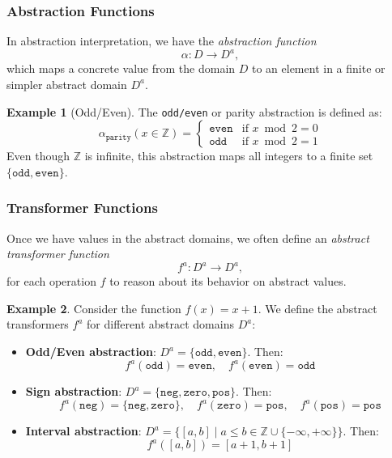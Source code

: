 \documentclass[oneside,11pt,dvipsnames]{book}
\numberwithin{equation}{section}
\theoremstyle{definition}
\newtheorem{example}{Example}[section]
\theoremstyle{remark}
\begin{document}
\subsubsection{Abstraction Functions} In abstraction interpretation, we have the \emph{abstraction function}
\[
\alpha : D \to D^a,
\]
which maps a concrete value from the domain $D$ to an element in a finite or simpler abstract domain $D^a$. 

\begin{example}[Odd/Even]
    The \texttt{odd/even} or parity abstraction is defined as:
\[
\alpha_{\texttt{parity}}(x \in \mathbb{Z}) =
\begin{cases}
\texttt{even} & \text{if } x \bmod 2 = 0 \\
\texttt{odd}  & \text{if } x \bmod 2 = 1
\end{cases}
\]
Even though $\mathbb{Z}$ is infinite, this abstraction maps all integers to a finite set $\{\texttt{odd}, \texttt{even}\}$. 
\end{example}

\subsubsection{Transformer Functions} Once we have values in the abstract domains, we often define an \emph{abstract transformer function} 
\[
f^a : D^a \to D^a,
\]
for each operation \(f\) to reason about its behavior on abstract values.


\begin{example}
 Consider the function $f(x) = x + 1$. We define the abstract transformers $f^a$ for different abstract domains $D^a$:

 \begin{itemize}
\item \textbf{Odd/Even abstraction}:  $D^a = \{\texttt{odd}, \texttt{even}\}$. Then:
\[
f^a(\texttt{odd}) = \texttt{even}, \quad
f^a(\texttt{even}) = \texttt{odd}
\]

\item \textbf{Sign abstraction}: $D^a = \{\texttt{neg}, \texttt{zero}, \texttt{pos}\}$. Then: 
\[
f^a(\texttt{neg}) = \{\texttt{neg}, \texttt{zero}\}, \quad
f^a(\texttt{zero}) = \texttt{pos}, \quad
f^a(\texttt{pos}) = \texttt{pos}
\]


\item \textbf{Interval abstraction}: $D^a = \{ [a, b] \mid a \leq b \in \mathbb{Z} \cup \{-\infty, +\infty\} \}$. Then:
\[
f^a([a, b]) = [a+1, b+1]
\]

 \end{itemize}

\end{example}
\end{document}
